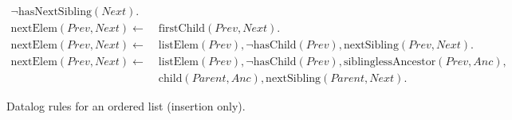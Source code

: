 \documentclass[twocolumn,10pt]{article}
\begin{document}
\begin{figure*}
\begin{align*}
    \neg\mathrm{hasNextSibling}(\mathit{Next}).
\\
    \mathrm{nextElem}(\mathit{Prev}, \mathit{Next}) \leftarrow\; &
    \mathrm{firstChild}(\mathit{Prev}, \mathit{Next}).
\\
    \mathrm{nextElem}(\mathit{Prev}, \mathit{Next}) \leftarrow\; &
    \mathrm{listElem}(\mathit{Prev}),
    \neg\mathrm{hasChild}(\mathit{Prev}),
    \mathrm{nextSibling}(\mathit{Prev}, \mathit{Next}).
\\
    \mathrm{nextElem}(\mathit{Prev}, \mathit{Next}) \leftarrow\; &
    \mathrm{listElem}(\mathit{Prev}),
    \neg\mathrm{hasChild}(\mathit{Prev}),
    \mathrm{siblinglessAncestor}(\mathit{Prev}, \mathit{Anc}), \\&
    \mathrm{child}(\mathit{Parent}, \mathit{Anc}),
    \mathrm{nextSibling}(\mathit{Parent}, \mathit{Next}).
\end{align*}
\caption{Datalog rules for an ordered list (insertion only).}
\end{figure*}

{\footnotesize

{}}
\end{document}
